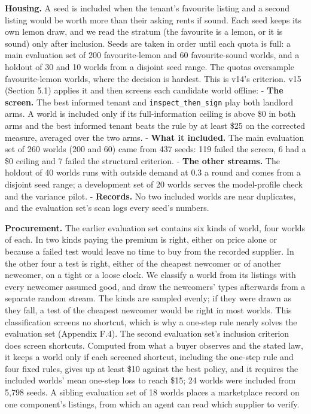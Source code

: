 \textbf{Housing.} A seed is included when the tenant's favourite listing and a second listing would be
worth more than their asking rents if sound. Each seed keeps its own lemon draw, and we read the
stratum (the favourite is a lemon, or it is sound) only after inclusion. Seeds are taken in order
until each quota is full: a main evaluation set of 200 favourite-lemon and 60 favourite-sound worlds,
and a holdout of 30 and 10 worlds from a disjoint seed range. The quotas oversample favourite-lemon
worlds, where the decision is hardest. This is v14's criterion. v15 (Section 5.1) applies it and then
screens each candidate world offline:
- \textbf{The screen.} The best informed tenant and \texttt{inspect\_\allowbreak{}then\_\allowbreak{}sign} play both landlord arms. A world is included only
if its full-information ceiling is above \$0 in both arms and the best informed tenant beats the rule by at least
\$25 on the corrected measure, averaged over the two arms.
- \textbf{What it included.} The main evaluation set of 260 worlds (200 and 60) came from 437 seeds: 119 failed the
screen, 6 had a \$0 ceiling and 7 failed the structural criterion.
- \textbf{The other streams.} The holdout of 40 worlds runs with outside demand at 0.3 a round and comes from a disjoint
seed range; a development set of 20 worlds serves the model-profile check and the variance pilot.
- \textbf{Records.} No two included worlds are near duplicates, and the evaluation set's scan logs every seed's numbers.

\textbf{Procurement.} The earlier evaluation set contains six kinds of world, four worlds of each. In two
kinds paying the premium is right, either on price alone or because a failed test would leave no
time to buy from the recorded supplier. In the other four a test is right, either of the cheapest
newcomer or of another newcomer, on a tight or a loose clock. We classify a world from its listings
with every newcomer assumed good, and draw the newcomers' types afterwards from a separate random
stream. The kinds are sampled evenly; if they were drawn as they fall, a test of the cheapest
newcomer would be right in most worlds. This classification screens no shortcut, which is why a
one-step rule nearly solves the evaluation set (Appendix F.4). The second evaluation set's inclusion
criterion does screen shortcuts. Computed from what a buyer observes and the stated law, it keeps a
world only if each screened shortcut, including the one-step rule and four fixed rules, gives up at
least \$10 against the best policy, and it requires the included worlds' mean one-step loss to reach
\$15; 24 worlds were included from 5,798 seeds. A sibling evaluation set of 18 worlds places a
marketplace record on one component's listings, from which an agent can read which supplier to
verify.

